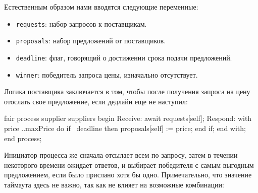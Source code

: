 \documentclass[14pt, openany]{report}
\newcommand{\prog}[1]{\lstinline[style=progStyle]{#1}}
\begin{document}
Естественным образом нами вводятся следующие переменные:
\begin{itemize}
  \item \prog{requests}: набор запросов к поставщикам.
  \item \prog{proposals}: набор предложений от поставщиков.
  \item \prog{deadline}: флаг, говорящий о достижении срока подачи предложений.
  \item \prog{winner}: победитель запроса цены, изначально отсутствует.
\end{itemize}

Логика поставщика заключается в том, чтобы после получения запроса на цену отослать свое предложение, если дедлайн еще не наступил:

\begin{ppcal}
  fair process supplier \in suppliers
  begin
  Receive:
    await requests[self];
  Respond:
    with price ..maxPrice  do
      if ~deadline then
        proposals[self] := price;
      end if;
    end with;
  end process;
\end{ppcal}
\begin{tlatex}
%
%
%
%
%
%
%
%
%
%
\end{tlatex}

Инициатор процесса же сначала отсылает всем по запросу, затем в течении некоторого времени ожидает ответов, и выбирает победителя с самым выгодным предложением, если было прислано хотя бы одно. Примечательно, что значение таймаута здесь не важно, так как не влияет на возможные комбинации:
\end{document}

